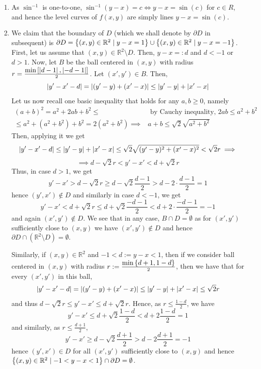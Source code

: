 \documentclass[8pt]{article} %
\begin{document}
\begin{description}
{\begin{enumerate}[\bfseries(a)]
				onto (i.e. its image is the whole $\mathbb{R}$), as taking $x=0$ and making $y$ run through the whole $[-1,1]$ (all such pairs
				are in $D$), we will cover 
				$[-1,1]$. Now, as $y-x:D\mapsto[-1,1]$ is onto, the range of $\sin^{-1}(y-x)$ is equal to the range of $\sin^{-1}(x)$ defined on $[-1,1]$ and
				this is known to be $[-\frac{\pi}{2},\frac{\pi}{2}]$. Hence, the range is $R=[-\frac{\pi}{2},\frac{\pi}{2}]$.
			\item As $\sin^{-1}$ is one-to-one, $\sin^{-1}(y-x)=c\iff y-x=\sin(c)$ for $c\in R$, and hence the level curves of $f(x,y)$ are simply lines
				$y-x=\sin(c)$.
			\item We claim that the boundary of $D$ (which we shall denote by $\partial D$ in subsequent) is
				$\partial D=\left\{(x,y)\in\mathbb{R}^2\mid y-x=1\right\}\cup\left\{(x,y)\in\mathbb{R}^2\mid y-x=-1\right\}$. First,
				let us assume that $(x,y)\in\mathbb{R}^2\setminus D$. Then, $y-x=:d$ and $d<-1$ or $d>1$. 
				Now, let $B$ be the ball centered in $(x,y)$ with radius
				$r=\frac{\min\mysbra{\myabs{d-1},\myabs{-d-1}}}{2}$. Let $(x',y')\in B$. Then,
				\[\left|y'-x'-d\right|=\left|(y'-y)+(x'-x)\right|\leq\left|y'-y\right|+\left|x'-x\right|\]
				Let us now recall one basic inequality that holds for any $a,b\geq 0$, namely
				\[\begin{array}{lr}
					(a+b)^2=a^2+2ab+b^2\leq &\mbox{ by Cauchy inequality, $2ab\leq a^2+b^2$}\\
					\leq a^2+(a^2+b^2)+b^2=2(a^2+b^2)\implies& a+b\leq\sqrt{2}\sqrt{a^2+b^2}\end{array}\]
				Then, applying it we get
				\[\left|y'-x'-d\right|\leq\left|y'-y\right|+\left|x'-x\right|\leq\sqrt{2}\sqrt{(y'-y)^2+(x'-x)^2}<\sqrt{2}r\implies\]
				\[\implies d-\sqrt{2}r<y'-x'<d+\sqrt{2}r\]
				Thus, in case $d>1$, we get \[y'-x'>d-\sqrt{2}r\geq d-\sqrt{2}\frac{d-1}{2}>d-2\cdot\frac{d-1}{2}=1\] hence
				$(y',x')\notin D$ and similarly in case $d<-1$, we get
				\[y'-x'<d+\sqrt{2}r\leq d+\sqrt{2}\frac{-d-1}{2}<d+2\cdot\frac{-d-1}{2}=-1\]
				and again $(x',y')\notin D$. We see that in any case, $B\cap D=\emptyset$ as for $(x',y')$ sufficiently
				close to $(x,y)$ we have $(x',y')\notin D$ and hence 
				$\partial D\cap(\mathbb{R}^2\setminus D)=\emptyset$. 
				
				Similarly, if $(x,y)\in\mathbb{R}^2$ and $-1<d:=y-x<1$, then if we consider ball centered in $(x,y)$
				with radius $r:=\frac{\min\mycbra{{d+1},{1-d}}}{2}$, then we have that for every $(x',y')$ in this
				ball, \[\left|y'-x'-d\right|=\left|(y'-y)+(x'-x)\right|\leq\left|y'-y\right|+\left|x'-x\right|\leq \sqrt{2}r\]
				and thus $d-\sqrt{2}r\leq y'-x'\leq d+\sqrt{2}r$. Hence, as $r\leq \frac{1-d}{2}$, we have
				\[y'-x'\leq d+\sqrt{2}\frac{1-d}{2}<d+2\frac{1-d}{2}=1\]
				and similarly, as $r\leq\frac{d+1}{2}$,
				\[y'-x'\geq d-\sqrt{2}\frac{d+1}{2}>d-2\frac{d+1}{2}=-1\]
				hence $(y',x')\in D$ for all $(x',y')$ sufficiently close to $(x,y)$ and hence $\left\{(x,y)\in\mathbb{R}^2\mid -1<
				y-x<1\right\}\cap \partial D=\emptyset$.
				

\end{enumerate}}
\end{description}
\end{document}
